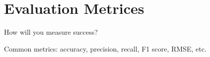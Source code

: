 \section{Evaluation Metrices}
How will you measure success?

Common metrics: accuracy, precision, recall, F1 score, RMSE, etc.